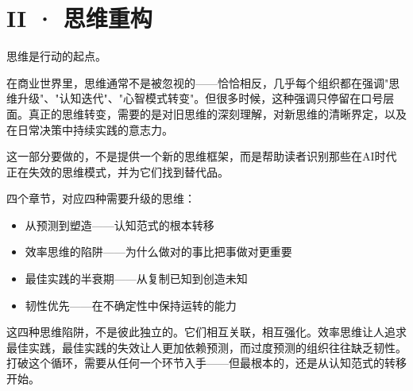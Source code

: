\part{II · 思维重构}



思维是行动的起点。

在商业世界里，思维通常不是被忽视的——恰恰相反，几乎每个组织都在强调"思维升级"、"认知迭代"、"心智模式转变"。但很多时候，这种强调只停留在口号层面。真正的思维转变，需要的是对旧思维的深刻理解，对新思维的清晰界定，以及在日常决策中持续实践的意志力。

这一部分要做的，不是提供一个新的思维框架，而是帮助读者识别那些在AI时代正在失效的思维模式，并为它们找到替代品。

四个章节，对应四种需要升级的思维：
\begin{itemize}
\item 从预测到塑造——认知范式的根本转移
\item 效率思维的陷阱——为什么做对的事比把事做对更重要
\item 最佳实践的半衰期——从复制已知到创造未知
\item 韧性优先——在不确定性中保持运转的能力

\end{itemize}
这四种思维陷阱，不是彼此独立的。它们相互关联，相互强化。效率思维让人追求最佳实践，最佳实践的失效让人更加依赖预测，而过度预测的组织往往缺乏韧性。打破这个循环，需要从任何一个环节入手——但最根本的，还是从认知范式的转移开始。
